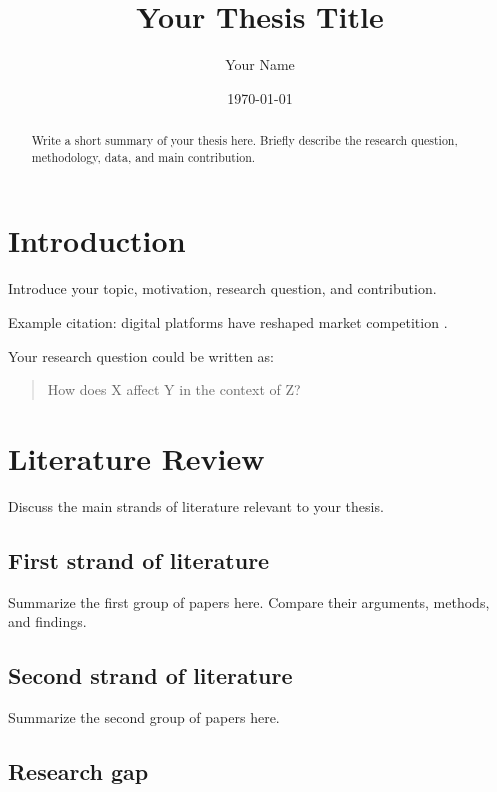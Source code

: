 \documentclass[12pt,a4paper]{article}
\title{Your Thesis Title}
\author{Your Name}
\date{\today}
\begin{document}
\maketitle

\begin{abstract}
Write a short summary of your thesis here. Briefly describe the research question,
methodology, data, and main contribution.
\end{abstract}

\tableofcontents
\newpage

\section{Introduction}

Introduce your topic, motivation, research question, and contribution.

Example citation: digital platforms have reshaped market competition \parencite{smith2021}.

Your research question could be written as:

\begin{quote}
How does X affect Y in the context of Z?
\end{quote}

\section{Literature Review}

Discuss the main strands of literature relevant to your thesis.

\subsection{First strand of literature}

Summarize the first group of papers here. Compare their arguments, methods, and findings.

\subsection{Second strand of literature}

Summarize the second group of papers here.

\subsection{Research gap}
\end{document}
